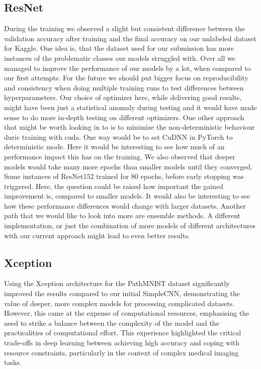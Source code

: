 \subsection{ResNet}\label{ResNetDiscussion}
During the training we observed a slight but consistent difference between the validation accuracy after training and the final accuracy on our unlabeled dataset for Kaggle. One idea is, that the dataset used for our submission has more instances of the problematic classes our models struggled with. Over all we managed to improve the performance of our models by a lot, when compared to our first attempts. For the future we should put bigger focus on reproducibility and consistency when doing multiple training runs to test differences between hyperparameters. Our choice of optimizer here, while delivering good results, might have been just a statistical anomaly during testing and it would have made sense to do more in-depth testing on different optimizers. One other approach that might be worth looking in to is to minimize the non-deterministic behaviour duric training with cuda. One way would be to set CuDNN in PyTorch to deterministic mode. Here it would be interesting to see how much of an performance impact this has on the training. We also observed that deeper models would take many more epochs than smaller models until they converged. Some instances of ResNet152 trained for 80 epochs, before early stopping was triggered. Here, the question could be raised how important the gained improvement is, compared to smaller models. It would also be interesting to see how these performance differences would change with larger datasets. Another path that we would like to look into more are ensemble methods. A different implementation, or just the combination of more models of different architectures with our current approach might lead to even better results. 

\subsection{Xception}\label{XceptionDiscussion}
Using the Xception architecture for the PathMNIST dataset significantly improved the results compared to our initial SimpleCNN, demonstrating the value of deeper, more complex models for processing complicated datasets. However, this came at the expense of computational resources, emphasising the need to strike a balance between the complexity of the model and the practicalities of computational effort. This experience highlighted the critical trade-offs in deep learning between achieving high accuracy and coping with resource constraints, particularly in the context of complex medical imaging tasks.